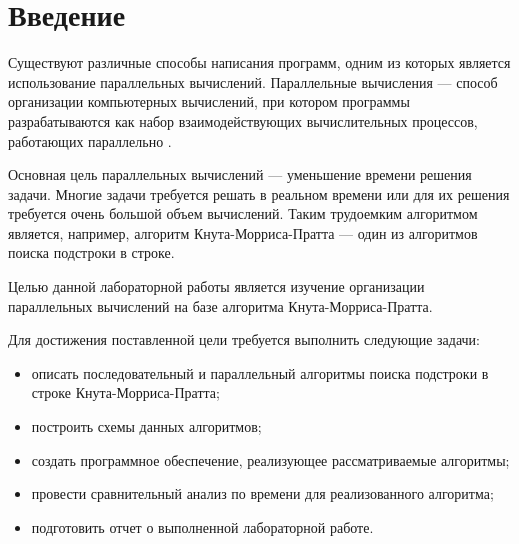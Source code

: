 \chapter*{Введение}

Существуют различные способы написания программ, одним из которых является использование параллельных вычислений.
Параллельные вычисления --- способ организации компьютерных вычислений, при котором программы разрабатываются как набор взаимодействующих вычислительных процессов, работающих параллельно \cite{multi}.

Основная цель параллельных вычислений --- уменьшение времени решения задачи.
Многие задачи требуется решать в реальном времени или для их решения требуется очень большой объем вычислений.
Таким трудоемким алгоритмом является, например, алгоритм Кнута-Морриса-Пратта --- один из алгоритмов поиска подстроки в строке.

Целью данной лабораторной работы является изучение организации параллельных вычислений на базе алгоритма Кнута-Морриса-Пратта.

Для достижения поставленной цели требуется выполнить следующие задачи:

\begin{itemize}
	\item описать последовательный и параллельный алгоритмы поиска подстроки в строке Кнута-Морриса-Пратта;
	\item построить схемы данных алгоритмов;
	\item создать программное обеспечение, реализующее рассматриваемые алгоритмы;
	\item провести сравнительный анализ по времени для реализованного алгоритма;
	\item подготовить отчет о выполненной лабораторной работе.
\end{itemize}